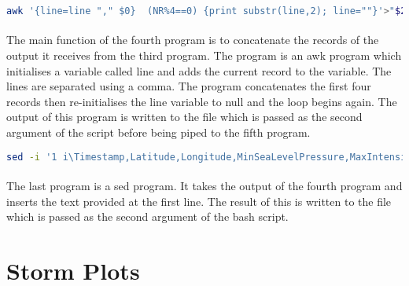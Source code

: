 \documentclass[]{article}
\begin{document}
\begin{lstlisting}[language=Bash, caption = Fourth program]
awk '{line=line "," $0}  (NR%4==0) {print substr(line,2); line=""}'>"$2" 
\end{lstlisting}
\paragraph{}The main function of the fourth program is to concatenate the records of the output it receives from the third program. The program is an awk program which initialises a variable called line and adds the current record to the variable. The lines are separated using a comma. The program concatenates the first four records then re-initialises the line variable to null and the loop begins again. The output of this program is written to the file which is passed as the second argument of the script before being piped to the fifth program.

\begin{lstlisting}[language=Bash, caption = Fifth program]
sed -i '1 i\Timestamp,Latitude,Longitude,MinSeaLevelPressure,MaxIntensity' "$2"
\end{lstlisting}
\paragraph{}The last program is a sed program. It takes the output of the fourth program and inserts the text provided at the first line. The result of this is written to the file which is passed as the second argument of the bash script.


\section{Storm Plots}
\end{document}

